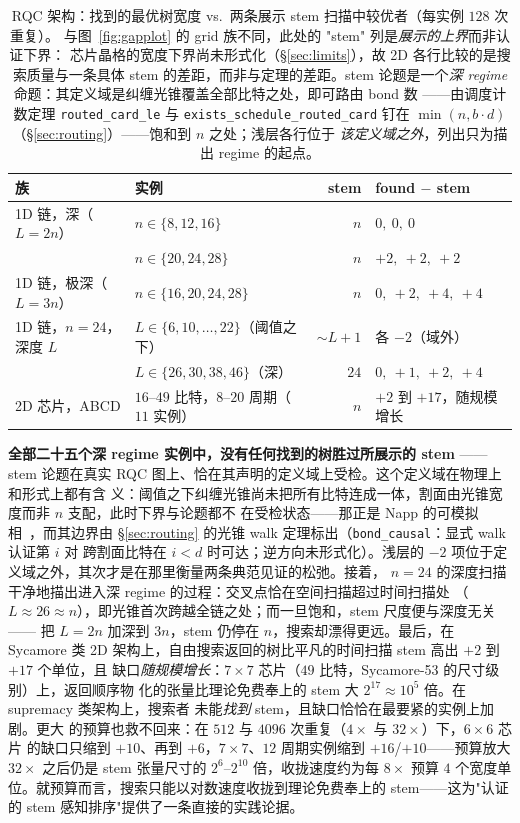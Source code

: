 \documentclass[11pt]{ctexart}
\begin{document}
\begin{table}[t]
\caption{RQC 架构：找到的最优树宽度 vs.\ 两条展示 stem 扫描中较优者（每实例 $128$ 次重复）。
与图~\ref{fig:gapplot} 的 grid 族不同，此处的 "stem" 列是\emph{展示的上界}而非认证下界：
芯片晶格的宽度下界尚未形式化（\S\ref{sec:limits}），故 2D 各行比较的是搜索质量与一条具体
stem 的差距，而非与定理的差距。stem 论题是一个\emph{深 regime} 命题：其定义域是纠缠光锥覆盖全部比特之处，即可路由 bond 数
——由调度计数定理 \texttt{routed\_card\_le} 与 \texttt{exists\_schedule\_routed\_card} 钉在
$\min(n,b\cdot d)$（\S\ref{sec:routing}）——饱和到 $n$ 之处；浅层各行位于
\emph{该定义域之外}，列出只为描出 regime 的起点。}
\label{tab:rqc}
\centering\small
\begin{tabular}{llrl}
\hline
族 & 实例 & stem & found $-$ stem \\
\hline
1D 链，深（$L{=}2n$） & $n \in \{8, 12, 16\}$ & $n$ & $0,\ 0,\ 0$ \\
                      & $n \in \{20, 24, 28\}$ & $n$ & $+2,\ +2,\ +2$ \\
1D 链，极深（$L{=}3n$） & $n \in \{16, 20, 24, 28\}$ & $n$ & $0,\ +2,\ +4,\ +4$ \\
1D 链，$n{=}24$，深度 $L$ & $L \in \{6, 10, \ldots, 22\}$（阈值之下） & $\sim L{+}1$ & 各 $-2$（域外） \\
                      & $L \in \{26, 30, 38, 46\}$（深） & $24$ & $0,\ +1,\ +2,\ +4$ \\
2D 芯片，ABCD & $16$--$49$ 比特，$8$--$20$ 周期（$11$ 实例） & $n$ & $+2$ 到 $+17$，随规模增长 \\
\hline
\end{tabular}
\end{table}

\textbf{全部二十五个深 regime 实例中，没有任何找到的树胜过所展示的 stem}
——stem 论题在真实 RQC 图上、恰在其声明的定义域上受检。这个定义域在物理上和形式上都有含
义：阈值之下纠缠光锥尚未把所有比特连成一体，割面由光锥宽度而非 $n$ 支配，此时下界与论题都不
在受检状态——那正是 Napp 的可模拟相~\cite{napp2022efficient}，而其边界由
\S\ref{sec:routing} 的光锥 walk 定理标出（\texttt{bond\_causal}：显式 walk 认证第 $i$ 对
跨割面比特在 $i<d$ 时可达；逆方向未形式化）。浅层的 $-2$ 项位于定义域之外，其次才是在那里衡量两条典范见证的松弛。接着，
$n{=}24$ 的深度扫描干净地描出进入深 regime 的过程：交叉点恰在空间扫描超过时间扫描处
（$L\approx 26\approx n$），即光锥首次跨越全链之处；而一旦饱和，stem 尺度便与深度无关——
把 $L{=}2n$ 加深到 $3n$，stem 仍停在 $n$，搜索却漂得更远。最后，在
Sycamore 类 2D 架构上，自由搜索返回的树比平凡的时间扫描 stem 高出 $+2$ 到 $+17$ 个单位，且
缺口\emph{随规模增长}：$7\times 7$ 芯片（$49$ 比特，Sycamore-53 的尺寸级别）上，返回顺序物
化的张量比理论免费奉上的 stem 大 $2^{17}\approx 10^{5}$ 倍。在 supremacy 类架构上，搜索者
未能\emph{找到} stem，且缺口恰恰在最要紧的实例上加剧。更大
的预算也救不回来：在 $512$ 与 $4096$ 次重复（$4\times$ 与 $32\times$）下，$6\times6$ 芯片
的缺口只缩到 $+10$、再到 $+6$，$7\times7$、$12$ 周期实例缩到 $+16$/$+10$——预算放大
$32\times$ 之后仍是 stem 张量尺寸的 $2^{6}$--$2^{10}$ 倍，收拢速度约为每 $8\times$ 预算
$4$ 个宽度单位。就预算而言，搜索只能以对数速度收拢到理论免费奉上的 stem——这为"认证的
stem 感知排序"提供了一条直接的实践论据。
\end{document}
